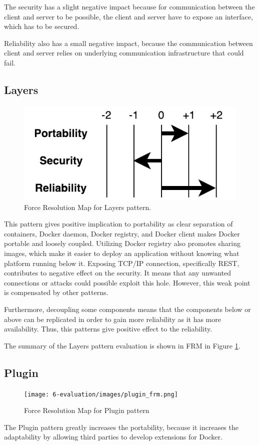 The security has a slight negative impact because for communication between the client and server to be possible, the client and server have to expose an interface, which has to be secured. 

Reliability also has a small negative impact, because the communication between client and server relies on underlying communication infrastructure that could fail. 

\subsection{Layers}

\begin{figure}[H]
\centering
\includegraphics[scale=0.7]{6-evaluation/images/layers_frm.pdf}
\caption{Force Resolution Map for Layers pattern.}
\label{fig:layers-frm}
\end{figure}
This pattern gives positive implication to portability as clear separation of
containers, Docker daemon, Docker registry, and Docker client makes Docker
portable and loosely coupled. Utilizing Docker registry also promotes sharing
images, which make it easier to deploy an application without knowing what
platform running below it. Exposing TCP/IP connection, specifically REST,
contributes to negative effect on the security. It means that any unwanted
connections or attacks could possible exploit this hole. However, this weak
point is compensated by other patterns. 

Furthermore, decoupling some components
means that the components below or above can be replicated in order to gain more
reliability as it has more availability. Thus, this patterns give positive
effect to the reliability. 

The summary of the Layers pattern evaluation is shown
in FRM in Figure \ref{fig:layers-frm}.

\subsection{Plugin}
\begin{figure}[H]
\centering
\texttt{[image: 6-evaluation/images/plugin\_frm.png]}
\caption{Force Resolution Map for Plugin pattern}
\label{fig:plugin-frm}
\end{figure}
The Plugin pattern greatly increases the portability, because it increases the adaptability by allowing third parties to develop extensions for Docker. 

